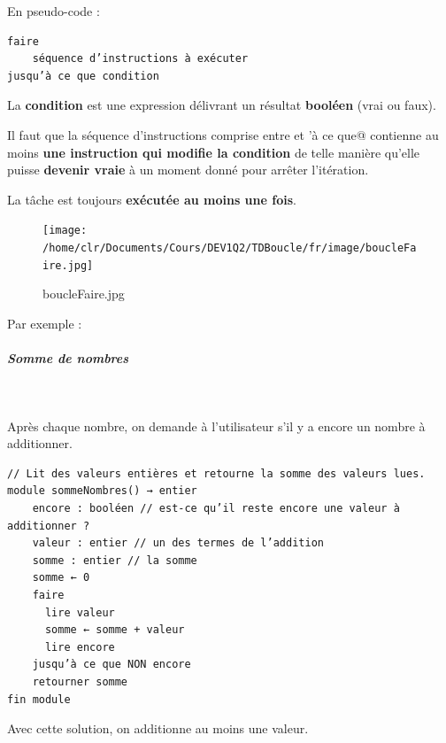 \documentclass[11pt,a4paper]{article}
\begin{document}
            \par
        En pseudo-code :
            \par
        \begin{verbatim}
faire
    séquence d’instructions à exécuter
jusqu’à ce que condition
      \end{verbatim}
        La \textbf{condition} est une expression d\'elivrant un r\'esultat 
        \textbf{bool\'een} (vrai ou faux).
      
            \par
        
        Il faut que la s\'equence d'instructions comprise entre \verb@faire@ 
        et \verb@jusqu’à ce que@ contienne au moins 
        \textbf{une instruction qui modifie la condition} de telle mani\`ere 
        qu'elle puisse \textbf{devenir vraie} \`a un moment donn\'e pour arr\^eter l'it\'eration.
      
            \par
        
        La t\^ache est toujours \textbf{ex\'ecut\'ee au moins une fois}.
      
            \par
        \begin{figure}[hbt]
				    \begin{center}
					\texttt{[image: /home/clr/Documents/Cours/DEV1Q2/TDBoucle/fr/image/boucleFaire.jpg]}
						\end{center}
                
                    \caption[boucleFaire.jpg]{boucleFaire.jpg}
                \end{figure}
                    
            \par
        Par exemple : 
            \par
        
			
		\subparagraph{Somme de nombres} 
		
					\textcolor{white}{.} \par
				 Apr\`es chaque nombre, on demande \`a l'utilisateur s'il y a encore un nombre \`a additionner.
            \par
        \begin{verbatim}
// Lit des valeurs entières et retourne la somme des valeurs lues.
module sommeNombres() → entier
    encore : booléen // est-ce qu’il reste encore une valeur à additionner ?
    valeur : entier // un des termes de l’addition
    somme : entier // la somme
    somme ← 0
    faire
      lire valeur
      somme ← somme + valeur
      lire encore
    jusqu’à ce que NON encore
    retourner somme
fin module
      \end{verbatim}Avec cette solution, on additionne au moins une valeur.
            \par
\end{document}
